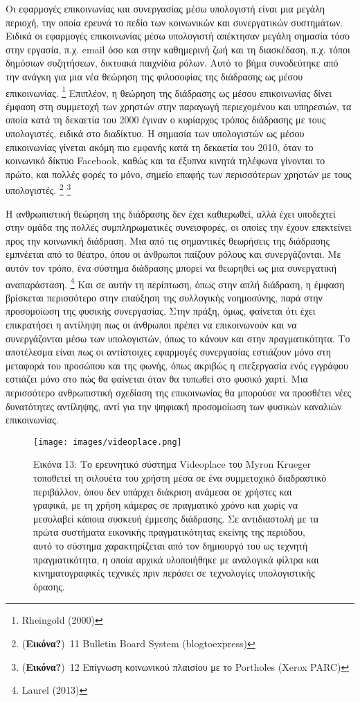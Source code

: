 \documentclass[
]{article}
\begin{document}
Οι εφαρμογές επικοινωνίας και συνεργασίας μέσω υπολογιστή είναι μια
μεγάλη περιοχή, την οποία ερευνά το πεδίο των κοινωνικών και
συνεργατικών συστημάτων. Ειδικά οι εφαρμογές επικοινωνίας μέσω
υπολογιστή απέκτησαν μεγάλη σημασία τόσο στην εργασία, π.χ. email όσο
και στην καθημερινή ζωή και τη διασκέδαση, π.χ. τόποι δημόσιων
συζητήσεων, δικτυακά παιχνίδια ρόλων. Αυτό το βήμα συνοδεύτηκε από την
ανάγκη για μια νέα θεώρηση της φιλοσοφίας της διάδρασης ως μέσου
επικοινωνίας. \footnote{Rheingold (2000)} Επιπλέον, η θεώρηση της
διάδρασης ως μέσου επικοινωνίας δίνει έμφαση στη συμμετοχή των χρηστών
στην παραγωγή περιεχομένου και υπηρεσιών, τα οποία κατά τη δεκαετία του
2000 έγιναν ο κυρίαρχος τρόπος διάδρασης με τους υπολογιστές, ειδικά στο
διαδίκτυο. Η σημασία των υπολογιστών ως μέσου επικοινωνίας γίνεται ακόμη
πιο εμφανής κατά τη δεκαετία του 2010, όταν το κοινωνικό δίκτυο
Facebook, καθώς και τα έξυπνα κινητά τηλέφωνα γίνονται το πρώτο, και
πολλές φορές το μόνο, σημείο επαφής των περισσότερων χρηστών με τους
υπολογιστές. \footnote{(\textbf{Εικόνα?})~11 Bulletin Board System
  (blogtoexpress)} \footnote{(\textbf{Εικόνα?})~12 Επίγνωση κοινωνικού
  πλαισίου με το Portholes (Xerox PARC)}

Η ανθρωπιστική θεώρηση της διάδρασης δεν έχει καθιερωθεί, αλλά έχει
υποδεχτεί στην ομάδα της πολλές συμπληρωματικές συνεισφορές, οι οποίες
την έχουν επεκτείνει προς την κοινωνική διάδραση. Μια από τις σημαντικές
θεωρήσεις της διάδρασης εμπνέεται από το θέατρο, όπου οι άνθρωποι
παίζουν ρόλους και συνεργάζονται. Με αυτόν τον τρόπο, ένα σύστημα
διάδρασης μπορεί να θεωρηθεί ως μια συνεργατική αναπαράσταση.
\footnote{Laurel (2013)} Και σε αυτήν τη περίπτωση, όπως στην απλή
διάδραση, η έμφαση βρίσκεται περισσότερο στην επαύξηση της συλλογικής
νοημοσύνης, παρά στην προσομοίωση της φυσικής συνεργασίας. Στην πράξη,
όμως, φαίνεται ότι έχει επικρατήσει η αντίληψη πως οι άνθρωποι πρέπει να
επικοινωνούν και να συνεργάζονται μέσω των υπολογιστών, όπως το κάνουν
και στην πραγματικότητα. Το αποτέλεσμα είναι πως οι αντίστοιχες
εφαρμογές συνεργασίας εστιάζουν μόνο στη μεταφορά του προσώπου και της
φωνής, όπως ακριβώς η επεξεργασία ενός εγγράφου εστιάζει μόνο στο πώς θα
φαίνεται όταν θα τυπωθεί στο φυσικό χαρτί. Μια περισσότερο ανθρωπιστική
σχεδίαση της επικοινωνίας θα μπορούσε να προσθέτει νέες δυνατότητες
αντίληψης, αντί για την ψηφιακή προσομοίωση των φυσικών καναλιών
επικοινωνίας.

\leavevmode{}%
\begin{figure}
\hypertarget{fig:videoplace}{%
\centering
\texttt{[image: images/videoplace.png]}
\caption{Εικόνα 13: Το ερευνητικό σύστημα Videoplace του Myron Krueger
τοποθετεί τη σιλουέτα του χρήστη μέσα σε ένα συμμετοχικό διαδραστικό
περιβάλλον, όπου δεν υπάρχει διάκριση ανάμεσα σε χρήστες και γραφικά, με
τη χρήση κάμερας σε πραγματικό χρόνο και χωρίς να μεσολαβεί κάποια
συσκευή έμμεσης διάδρασης. Σε αντιδιαστολή με τα πρώτα συστήματα
εικονικής πραγματικότητας εκείνης της περιόδου, αυτό το σύστημα
χαρακτηρίζεται από τον δημιουργό του ως τεχνητή πραγματικότητα, η οποία
αρχικά υλοποιήθηκε με αναλογικά φίλτρα και κινηματογραφικές τεχνικές
πριν περάσει σε τεχνολογίες υπολογιστικής όρασης.}\label{fig:videoplace}
}
\end{figure}
\end{document}
